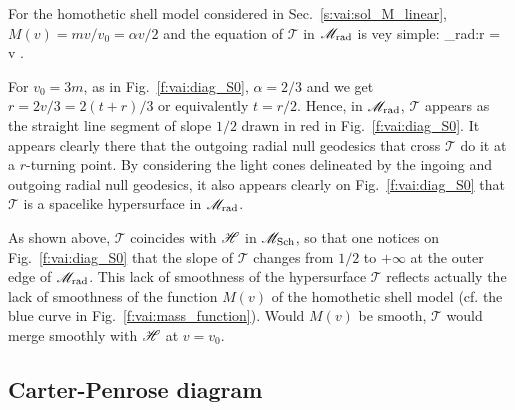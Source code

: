 For the homothetic shell model considered in Sec.~\ref{s:vai:sol_M_linear},
$M(v) = m v / v_0 = \alpha v / 2$ and the equation of
$\mathscr{T}$ in $\mathscr{M}_{\rm rad}$ is vey simple:
\be \label{e:vai:def_T_hom}
     \cap \M_{\rm rad}:\qquad r = \alpha v .
\ee

\begin{example}
For $v_0 = 3m$, as in Fig.~\ref{f:vai:diag_S0},
$\alpha = 2/3$ and we get $r = 2v/3 = 2(t+r)/3$ or equivalently $t = r / 2$. Hence, in $\mathscr{M}_{\rm rad}$,
$\mathscr{T}$ appears as the straight line segment of slope $1/2$
drawn in red in Fig.~\ref{f:vai:diag_S0}.
It appears clearly there that the outgoing radial null geodesics
that cross $\mathscr{T}$ do it at a $r$-turning point.
By considering the light cones delineated by the ingoing and outgoing radial null geodesics, it
also appears
clearly on Fig.~\ref{f:vai:diag_S0} that $\mathscr{T}$ is a spacelike hypersurface in $\mathscr{M}_{\rm rad}$.
\end{example}

\begin{remark}
As shown above, $\mathscr{T}$ coincides with $\mathscr{H}$ in $\mathscr{M}_{\rm Sch}$, so that one notices
on Fig.~\ref{f:vai:diag_S0} that the slope of $\mathscr{T}$ changes from $1/2$
to $+\infty$ at the outer edge of $\mathscr{M}_{\rm rad}$.
This lack of smoothness of the hypersurface $\mathscr{T}$ reflects actually
the lack of smoothness of the function $M(v)$ of the homothetic shell model
(cf. the blue curve in Fig.~\ref{f:vai:mass_function}). Would $M(v)$ be smooth,
$\mathscr{T}$ would merge smoothly with $\mathscr{H}$ at $v=v_0$.
\end{remark}

\subsection{Carter-Penrose diagram} \label{f:vai:thin_CP}

